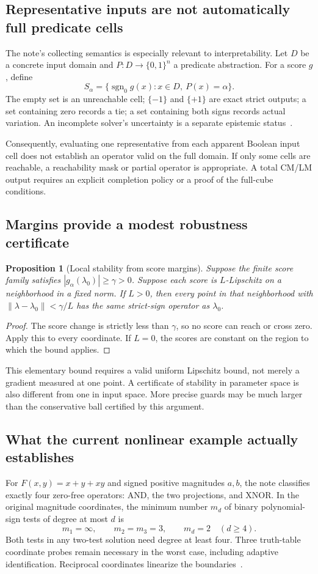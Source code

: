 \documentclass[11pt,a4paper]{article}
\newtheorem{proposition}{Proposition}[section]
\theoremstyle{remark}
\newcommand{\B}{\{0,1\}}
\newcommand{\sgn}{\operatorname{sgn}}
\begin{document}
\subsection{Representative inputs are not automatically full predicate cells}
The note's collecting semantics is especially relevant to interpretability. Let $D$ be a concrete input domain and $P:D\to\B^n$ a predicate abstraction. For a score $g$, define
\[
 S_\alpha=\{\sgn_0 g(x):x\in D,\ P(x)=\alpha\}.
\]
The empty set is an unreachable cell; $\{-1\}$ and $\{+1\}$ are exact strict outputs; a set containing zero records a tie; a set containing both signs records actual variation. An incomplete solver's uncertainty is a separate epistemic status~\cite[Section 4.3]{guard}.

Consequently, evaluating one representative from each apparent Boolean input cell does not establish an operator valid on the full domain. If only some cells are reachable, a reachability mask or partial operator is appropriate. A total CM/LM output requires an explicit completion policy or a proof of the full-cube conditions.

\subsection{Margins provide a modest robustness certificate}
\begin{proposition}[Local stability from score margins]
Suppose the finite score family satisfies $|g_\alpha(\lambda_0)|\ge\gamma>0$. Suppose each score is $L$-Lipschitz on a neighborhood in a fixed norm. If $L>0$, then every point in that neighborhood with $\|\lambda-\lambda_0\|<\gamma/L$ has the same strict-sign operator as $\lambda_0$.
\end{proposition}
\begin{proof}
The score change is strictly less than $\gamma$, so no score can reach or cross zero. Apply this to every coordinate. If $L=0$, the scores are constant on the region to which the bound applies.
\end{proof}
This elementary bound requires a valid uniform Lipschitz bound, not merely a gradient measured at one point. A certificate of stability in parameter space is also different from one in input space. More precise guards may be much larger than the conservative ball certified by this argument.

\subsection{What the current nonlinear example actually establishes}
For $F(x,y)=x+y+xy$ and signed positive magnitudes $a,b$, the note classifies exactly four zero-free operators: AND, the two projections, and XNOR. In the original magnitude coordinates, the minimum number $m_d$ of binary polynomial-sign tests of degree at most $d$ is
\[
 m_1=\infty,\qquad m_2=m_3=3,\qquad m_d=2\quad(d\ge4).
\]
Both tests in any two-test solution need degree at least four. Three truth-table coordinate probes remain necessary in the worst case, including adaptive identification. Reciprocal coordinates linearize the boundaries~\cite[Sections 2--3 and 5]{guard}.
\end{document}
